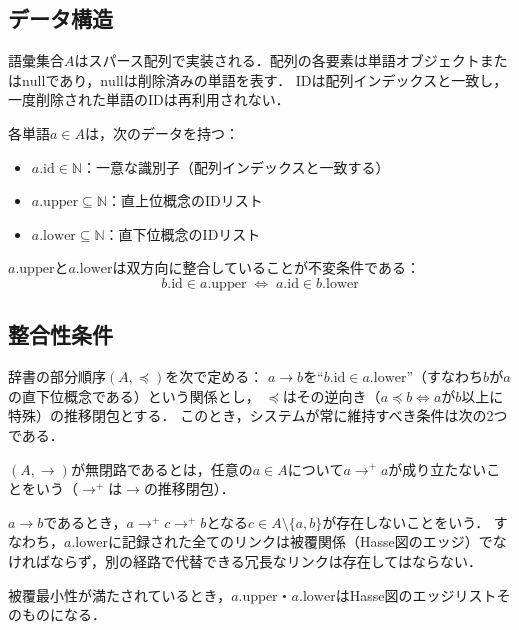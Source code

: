 \documentclass[../../main-detail.tex]{subfiles}
\begin{document}
\subsection{データ構造}

語彙集合$A$はスパース配列で実装される．配列の各要素は単語オブジェクトまたは$\mathrm{null}$であり，$\mathrm{null}$は削除済みの単語を表す．
IDは配列インデックスと一致し，一度削除された単語のIDは再利用されない．

各単語$a \in A$は，次のデータを持つ：
\begin{itemize}
    \item $a.\mathrm{id} \in \mathbb{N}$：一意な識別子（配列インデックスと一致する）
    \item $a.\mathrm{upper} \subseteq \mathbb{N}$：直上位概念のIDリスト
    \item $a.\mathrm{lower} \subseteq \mathbb{N}$：直下位概念のIDリスト
\end{itemize}

$a.\mathrm{upper}$と$a.\mathrm{lower}$は双方向に整合していることが不変条件である：
$$
    b.\mathrm{id} \in a.\mathrm{upper}
    \;\iff\;
    a.\mathrm{id} \in b.\mathrm{lower}
$$

\subsection{整合性条件}

辞書の部分順序$(A, \preceq)$を次で定める：
$a \to b$を``$b.\mathrm{id} \in a.\mathrm{lower}$''（すなわち$b$が$a$の直下位概念である）という関係とし，
$\preceq$はその逆向き（$a \preceq b \iff a$が$b$以上に特殊）の推移閉包とする．
このとき，システムが常に維持すべき条件は次の2つである．

\begin{definition}[無閉路性]
    $(A, \to)$が無閉路であるとは，任意の$a \in A$について$a \to^+ a$が成り立たないことをいう（$\to^+$は$\to$の推移閉包）．
\end{definition}

\begin{definition}[被覆最小性]
    $a \to b$であるとき，$a \to^+ c \to^+ b$となる$c \in A \setminus \{a, b\}$が存在しないことをいう．
    すなわち，$a.\mathrm{lower}$に記録された全てのリンクは被覆関係（Hasse図のエッジ）でなければならず，別の経路で代替できる冗長なリンクは存在してはならない．
\end{definition}

被覆最小性が満たされているとき，$a.\mathrm{upper}$・$a.\mathrm{lower}$はHasse図のエッジリストそのものになる．
\end{document}

